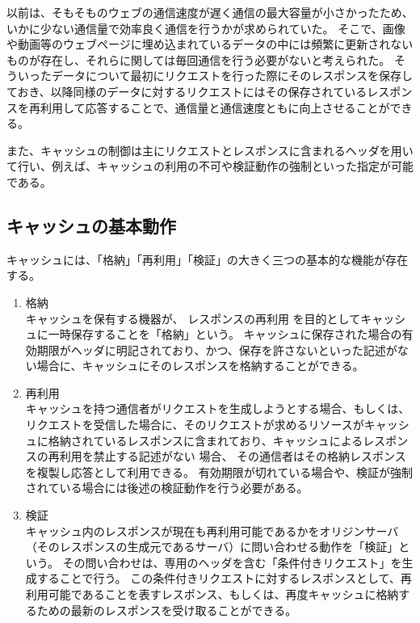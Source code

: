 \documentclass[12pt,a4paper]{jbook}
\begin{document}
以前は、そもそものウェブの通信速度が遅く通信の最大容量が小さかったため、いかに少ない通信量で効率良く通信を行うかが求められていた。
そこで、画像や動画等のウェブページに埋め込まれているデータの中には頻繁に更新されないものが存在し、それらに関しては毎回通信を行う必要がないと考えられた。
そういったデータについて最初にリクエストを行った際にそのレスポンスを保存しておき、以降同様のデータに対するリクエストにはその保存されているレスポンスを再利用して応答することで、通信量と通信速度ともに向上させることができる。

また、キャッシュの制御は主にリクエストとレスポンスに含まれるヘッダを用いて行い、例えば、キャッシュの利用の不可や検証動作の強制といった指定が可能である。

\subsection{キャッシュの基本動作}
キャッシュには、「格納」「再利用」「検証」の大きく三つの基本的な機能が存在する。

\begin{enumerate}
\item 格納\\
キャッシュを保有する機器が、
\color{red}
レスポンスの再利用
\color{black}
を目的としてキャッシュに一時保存することを「格納」という。
キャッシュに保存された場合の有効期限がヘッダに明記されており、かつ、保存を許さないといった記述がない場合に、キャッシュにそのレスポンスを格納することができる。
\item 再利用\\
キャッシュを持つ通信者がリクエストを生成しようとする場合、もしくは、リクエストを受信した場合に、そのリクエストが求めるリソースがキャッシュに格納されているレスポンスに含まれており、キャッシュによるレスポンスの再利用を禁止する記述がない
\color{red}
場合、
\color{black}
その通信者はその格納レスポンスを複製し応答として利用できる。
有効期限が切れている場合や、検証が強制されている場合には後述の検証動作を行う必要がある。
\item 検証\\
キャッシュ内のレスポンスが現在も再利用可能であるかをオリジンサーバ（そのレスポンスの生成元であるサーバ）に問い合わせる動作を「検証」という。
その問い合わせは、専用のヘッダを含む「条件付きリクエスト」を生成することで行う。
\color{red}
この条件付きリクエストに対するレスポンスとして、再利用可能であることを表すレスポンス、もしくは、再度キャッシュに格納するための最新のレスポンスを受け取ることができる。
\color{black}
\end{enumerate}
\end{document}
